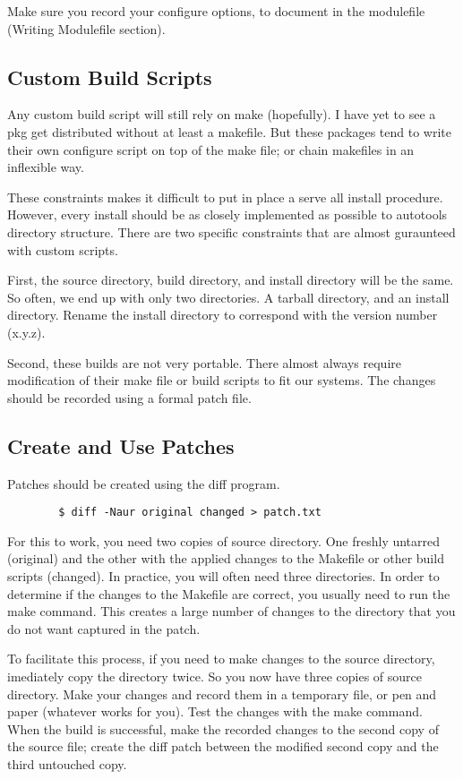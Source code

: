 \documentclass{article}
\begin{document}
Make sure you record your configure options, to document in the modulefile 
(Writing Modulefile section).

\subsection{Custom Build Scripts}

Any custom build script will still rely on make (hopefully).  I have yet to see 
a pkg get distributed without at least a makefile.  But these packages tend to 
write their own configure script on top of the make file; or chain makefiles in 
an inflexible way.

These constraints makes it difficult to put in place a serve all install 
procedure.  However, every install should be as closely implemented as possible 
to autotools directory structure.  There are two specific constraints that are 
almost guraunteed with custom scripts.

First, the source directory, build directory, and install directory will be the 
same.  So often, we end up with only two directories.  A tarball directory, and 
an install directory.  Rename the install directory to correspond with the 
version number (x.y.z).

Second, these builds are not very portable.  There almost always require 
modification of their make file or build scripts to fit our systems.  The 
changes should be recorded using a formal patch file.

\subsection{Create and Use Patches}

Patches should be created using the diff program.

\begin{verbatim}
		$ diff -Naur original changed > patch.txt
\end{verbatim}

For this to work, you need two copies of source directory.  One freshly 
untarred (original) and the other with the applied changes to the Makefile or 
other build scripts (changed).  In practice, you will often need three 
directories.  In order to determine if the changes to the Makefile are correct, 
you usually need to run the make command.  This creates a large number of 
changes to the directory that you do not want captured in the patch.

To facilitate this process, if you need to make changes to the source 
directory, imediately copy the directory twice.  So you now have three copies 
of source directory.  Make your changes and record them in a temporary file, or 
pen and paper (whatever works for you).  Test the changes with the make 
command.  When the build is successful, make the recorded changes to the second 
copy of the source file; create the diff patch between the modified second copy 
and the third untouched copy.
\end{document}
